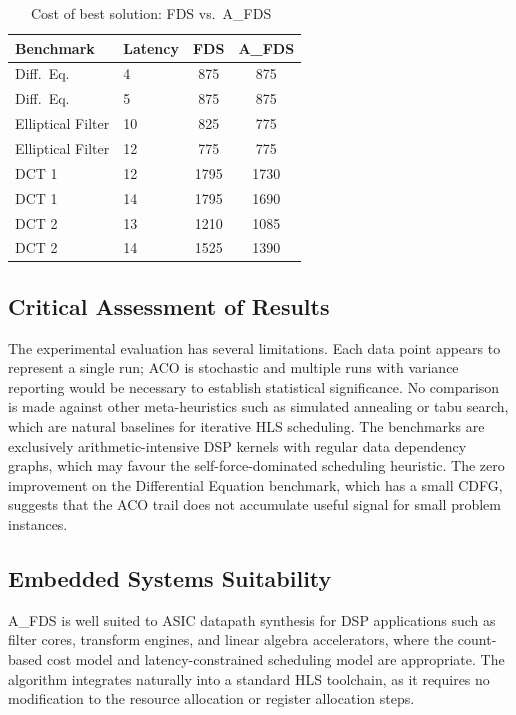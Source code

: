 \documentclass[conference]{IEEEtran}
\begin{document}
\begin{table}[h]
  \centering
  \caption{Cost of best solution: FDS vs.\ A\_FDS~\cite{kopuri2004aco}}
  \label{tab:results}
  \begin{tabular}{llcc}
    \toprule
    Benchmark & Latency & FDS & A\_FDS \\
    \midrule
    Diff.\ Eq.\ & 4 & 875 & 875 \\
    Diff.\ Eq.\ & 5 & 875 & 875 \\
    Elliptical Filter & 10 & 825 & 775 \\
    Elliptical Filter & 12 & 775 & 775 \\
    DCT 1 & 12 & 1795 & 1730 \\
    DCT 1 & 14 & 1795 & 1690 \\
    DCT 2 & 13 & 1210 & 1085 \\
    DCT 2 & 14 & 1525 & 1390 \\
    \bottomrule
  \end{tabular}
\end{table}

\subsection{Critical Assessment of Results}

The experimental evaluation has several limitations. Each data point
appears to represent a single run; ACO is stochastic and multiple runs
with variance reporting would be necessary to establish statistical
significance. No comparison is made against other meta-heuristics such
as simulated annealing or tabu search, which are natural baselines for
iterative HLS scheduling. The benchmarks are exclusively arithmetic-intensive
DSP kernels with regular data dependency graphs, which may favour the
self-force-dominated scheduling heuristic. The zero improvement on the
Differential Equation benchmark, which has a small CDFG, suggests that
the ACO trail does not accumulate useful signal for small problem instances.

\subsection{Embedded Systems Suitability}

A\_FDS is well suited to ASIC datapath synthesis for DSP applications
such as filter cores, transform engines, and linear algebra accelerators,
where the count-based cost model and latency-constrained scheduling model
are appropriate. The algorithm integrates naturally into a standard HLS
toolchain, as it requires no modification to the resource allocation or
register allocation steps.
\end{document}
